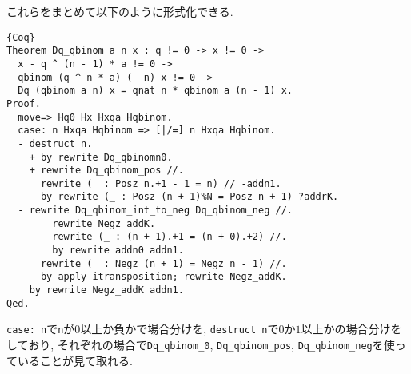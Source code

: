 \documentclass[11pt]{jsreport}
\theoremstyle{mystyle}
\newcommand{\0}{\textbf{0}}
\begin{document}
これらをまとめて以下のように形式化できる. 
\begin{lstlisting}{Coq}
Theorem Dq_qbinom a n x : q != 0 -> x != 0 ->
  x - q ^ (n - 1) * a != 0 ->
  qbinom (q ^ n * a) (- n) x != 0 ->
  Dq (qbinom a n) x = qnat n * qbinom a (n - 1) x.
Proof.
  move=> Hq0 Hx Hxqa Hqbinom.
  case: n Hxqa Hqbinom => [|/=] n Hxqa Hqbinom.
  - destruct n.
    + by rewrite Dq_qbinomn0.
    + rewrite Dq_qbinom_pos //.
      rewrite (_ : Posz n.+1 - 1 = n) // -addn1.
      by rewrite (_ : Posz (n + 1)%N = Posz n + 1) ?addrK.
  - rewrite Dq_qbinom_int_to_neg Dq_qbinom_neg //.
        rewrite Negz_addK.
        rewrite (_ : (n + 1).+1 = (n + 0).+2) //.
        by rewrite addn0 addn1.
      rewrite (_ : Negz (n + 1) = Negz n - 1) //.
      by apply itransposition; rewrite Negz_addK.
    by rewrite Negz_addK addn1.
Qed.
\end{lstlisting}
{\tt case:\,n}で{\tt n}が$0$以上か負かで場合分けを, {\tt destruct n}で$0$か$1$以上かの場合分けをしており, それぞれの場合で{\tt Dq\_qbinom\_0}, {\tt Dq\_qbinom\_pos}, {\tt Dq\_qbinom\_neg}を使っていることが見て取れる. 
\end{document}
